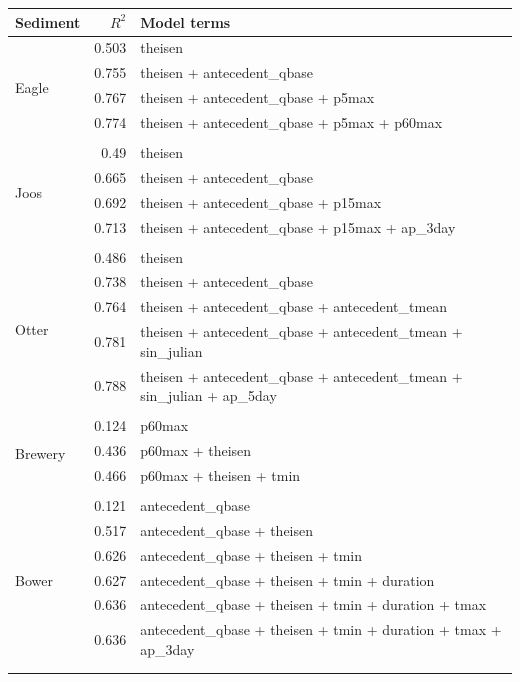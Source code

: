 \documentclass[12pt]{article}
\begin{document}
\begin{table}[h] \small
    \begin{center}
    \begin{tabular}{lrl}
    \textbf{Sediment} & $R^2$ & Model terms \\
    \hline
\multirow{5}{*}{Eagle} & 0.503 & theisen\\ 
 & 0.755 & theisen + antecedent\_qbase\\ 
 & 0.767 & theisen + antecedent\_qbase + p5max\\ 
 & 0.774 & theisen + antecedent\_qbase + p5max + p60max\\ 
\vspace{2mm}\\ \multirow{5}{*}{Joos} & 0.49 & theisen\\ 
 & 0.665 & theisen + antecedent\_qbase\\ 
 & 0.692 & theisen + antecedent\_qbase + p15max\\ 
 & 0.713 & theisen + antecedent\_qbase + p15max + ap\_3day\\ 
\vspace{2mm}\\ \multirow{6}{*}{Otter} & 0.486 & theisen\\ 
 & 0.738 & theisen + antecedent\_qbase\\ 
 & 0.764 & theisen + antecedent\_qbase + antecedent\_tmean\\ 
 & 0.781 & theisen + antecedent\_qbase + antecedent\_tmean + sin\_julian\\ 
 & 0.788 & theisen + antecedent\_qbase + antecedent\_tmean + sin\_julian + ap\_5day\\ 
\vspace{2mm}\\ \multirow{4}{*}{Brewery} & 0.124 & p60max\\ 
 & 0.436 & p60max + theisen\\ 
 & 0.466 & p60max + theisen + tmin\\ 
\vspace{2mm}\\ \multirow{7}{*}{Bower} & 0.121 & antecedent\_qbase\\ 
 & 0.517 & antecedent\_qbase + theisen\\ 
 & 0.626 & antecedent\_qbase + theisen + tmin\\ 
 & 0.627 & antecedent\_qbase + theisen + tmin + duration\\ 
 & 0.636 & antecedent\_qbase + theisen + tmin + duration + tmax\\ 
 & 0.636 & antecedent\_qbase + theisen + tmin + duration + tmax + ap\_3day\\ 
\vspace{2mm}\\     \vspace{6mm}\\


\end{tabular}
\end{center}
\end{table}
\end{document}
